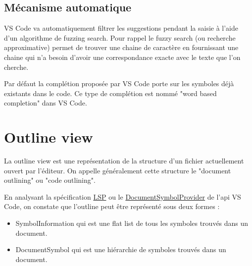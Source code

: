 \documentclass[
    iict, %
    il, %
]{heig-tb}
\begin{document}


\subsection{Mécanisme automatique}
VS Code va automatiquement filtrer les suggestions pendant la saisie à l'aide d'un algorithme de fuzzing search.
Pour rappel le fuzzy search (ou recherche approximative) permet de trouver une chaine de caractère en fournissant une chaine qui n'a besoin d'avoir une correspondance exacte
avec le texte que l'on cherche.

Par défaut la complétion proposée par VS Code porte sur les symboles déjà existants dans le code.
Ce type de complétion est nommé "word based completion" dans VS Code.

\section{Outline view}

La outline view est une représentation de la structure d'un fichier actuellement ouvert par l'éditeur. On appelle généralement cette structure le "document outlining" ou "code outlining".

En analysant la spécification \href{https://microsoft.github.io/language-server-protocol/specifications/lsp/3.17/specification/}{LSP} ou le \href{https://code.visualstudio.com/api/references/vscode-api#DocumentSymbol}{DocumentSymbolProvider} de l'api VS Code, on constate que l'outline peut être représenté sous deux formes :

\begin{itemize}
    \item SymbolInformation qui est une flat list de tous les symboles trouvés dans un document.
    \item DocumentSymbol qui est une hiérarchie de symboles trouvés dans un document.
\end{itemize}
\end{document}

